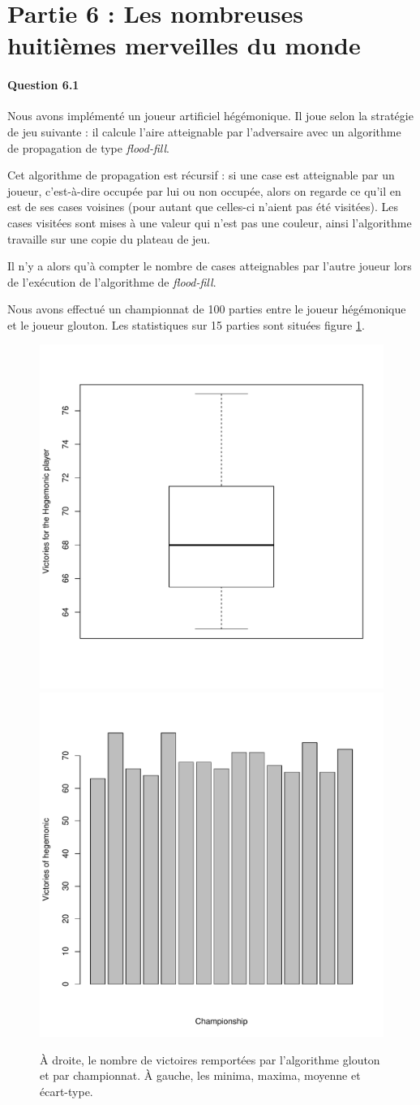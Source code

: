 \documentclass[a4paper]{article}
\begin{document}
    \section{Partie 6 : Les nombreuses huitièmes merveilles du monde}
    \paragraph{Question 6.1}
    Nous avons implémenté un joueur artificiel hégémonique. Il joue selon la 
stratégie de jeu suivante : il calcule l'aire atteignable par l'adversaire avec
un algorithme de propagation de type \emph{flood-fill}.

Cet algorithme de propagation est récursif : si une case est atteignable par un 
joueur, c'est-à-dire occupée par lui ou non occupée, alors on regarde ce qu'il 
en est de ses cases voisines (pour autant que celles-ci n'aient pas été 
visitées). Les cases visitées sont mises à une valeur qui n'est pas une 
couleur, ainsi l'algorithme travaille sur une copie du plateau de jeu.

Il n'y a alors qu'à compter le nombre de cases atteignables par l'autre joueur 
lors de l'exécution de l'algorithme de \emph{flood-fill}.

Nous avons effectué un championnat de 100 parties entre le joueur hégémonique 
et le joueur glouton. Les statistiques sur 15 parties sont situées figure 
\ref{hegemon_greedy}.


\begin{figure}
\centering

\includegraphics[width=.45\columnwidth]{hegemon_vs_greedy}
\includegraphics[width=.45\columnwidth]{hegemon_vs_greedy_bar}

\caption{\label{hegemon_greedy} À droite, le nombre de victoires remportées par 
l'algorithme glouton et par championnat. À gauche, les minima, maxima, moyenne 
et écart-type.}
\end{figure}
\end{document}
